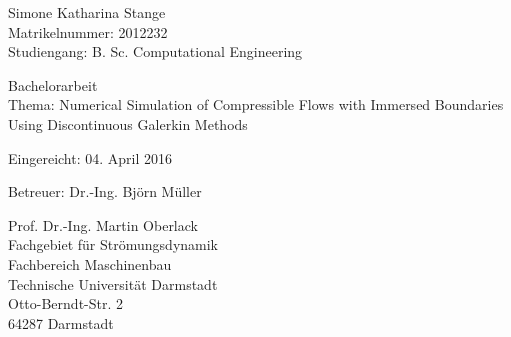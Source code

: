 \vspace*{14cm}
{\parindent0pt
Simone Katharina Stange\\
Matrikelnummer: 2012232 \\
Studiengang: B. Sc. Computational Engineering\newline
 
Bachelorarbeit\\
Thema: Numerical Simulation of Compressible Flows with Immersed Boundaries Using Discontinuous Galerkin Methods\newline

Eingereicht: 04. April 2016\newline

Betreuer: Dr.-Ing. Björn Müller \newline

Prof. Dr.-Ing. Martin Oberlack \\
Fachgebiet für Strömungsdynamik\\
Fachbereich Maschinenbau \\
Technische Universität Darmstadt \\
Otto-Berndt-Str. 2 \\
64287 Darmstadt}